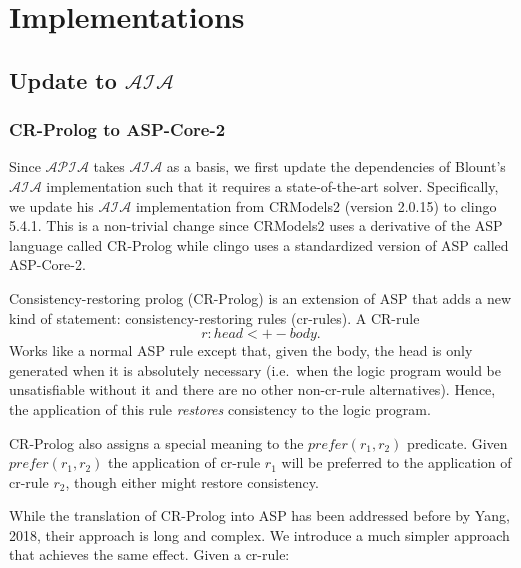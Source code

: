 \chapter{Implementations}

%

\section{Update to $\mathcal{AIA}$}

\subsection{CR-Prolog to ASP-Core-2}

Since $\mathcal{APIA}$ takes $\mathcal{AIA}$ as a basis, we first update the dependencies of Blount's $\mathcal{AIA}$ implementation such that it requires a state-of-the-art solver.
Specifically, we update his $\mathcal{AIA}$ implementation from CRModels2 (version 2.0.15) to clingo 5.4.1.
This is a non-trivial change since CRModels2 uses a derivative of the ASP language called CR-Prolog while clingo uses a standardized version of ASP called ASP-Core-2.

Consistency-restoring prolog (CR-Prolog) is an extension of ASP that adds a new kind of statement: consistency-restoring rules (cr-rules).
A CR-rule
\begin{equation}
    r: head <+- body.
\end{equation}
Works like a normal ASP rule except that, given the body, the head is only generated when it is absolutely necessary (i.e.~when the logic program would be unsatisfiable without it and there are no other non-cr-rule alternatives).
Hence, the application of this rule \textit{restores} consistency to the logic program.

CR-Prolog also assigns a special meaning to the $prefer(r_1, r_2)$ predicate.
Given $prefer(r_1, r_2)$ the application of cr-rule $r_1$ will be preferred to the application of cr-rule $r_2$, though either might restore consistency.

While the translation of CR-Prolog into ASP has been addressed before by Yang, 2018, their approach is long and complex.
We introduce a much simpler approach that achieves the same effect.
Given a cr-rule:

